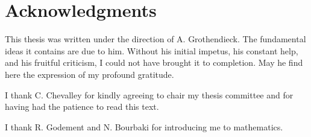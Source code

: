 \chapter*{Acknowledgments}

This thesis was written under the direction of A. Grothendieck. The
fundamental ideas it contains are due to him. Without his initial impetus,
his constant help, and his fruitful criticism, I could not have brought it
to completion. May he find here the expression of my profound gratitude.

I thank C. Chevalley for kindly agreeing to chair my thesis committee and
for having had the patience to read this text.

I thank R. Godement and N. Bourbaki for introducing me to mathematics.

